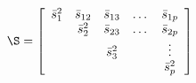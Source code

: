 

\[
\S = \left[ \begin{array}{ccccc} \bar{s}_{1}^2 & \bar{s}_{12} & \bar{s}_{13} & \dots & \bar{s}_{1p} \\ & \bar{s}_{2}^2 & \bar{s}_{23} & \dots & \bar{s}_{2p} \\ & & \bar{s}_{3}^2 & & \vdots \\ & & & & \bar{s}_{p}^2  \end{array} \right]
\]


